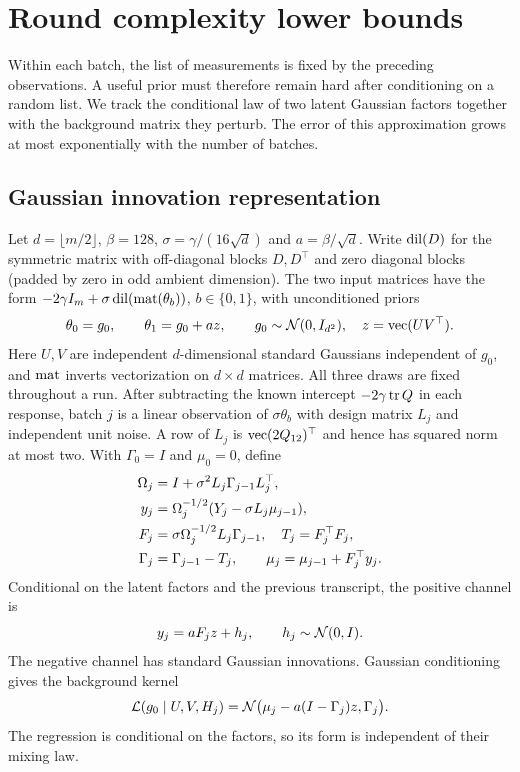 \section{Round complexity lower bounds}
\label{sec:rounds}

Within each batch, the list of measurements is fixed by the preceding observations. A useful prior must therefore remain hard after conditioning on a random list. We track the conditional law of two latent Gaussian factors together with the background matrix they perturb. The error of this approximation grows at most exponentially with the number of batches.

\subsection{Gaussian innovation representation}

Let $d=\lfloor m/2\rfloor$, $\beta=128$, $\sigma=\gamma/(16\sqrt d)$ and $a=\beta/\sqrt d$. Write $\operatorname{dil}(D)$ for the symmetric matrix with off-diagonal blocks $D,D^\top$ and zero diagonal blocks (padded by zero in odd ambient dimension). The two input matrices have the form $-2\gamma I_m+\sigma\operatorname{dil}(\operatorname{mat}(\theta_b))$, $b\in\{0,1\}$, with unconditioned priors
\[
 \theta_0=g_0,\qquad
 \theta_1=g_0+a z,\qquad
 g_0\sim\mathcal N(0,I_{d^2}),\quad z=\operatorname{vec}(UV^\top).
\]
Here $U,V$ are independent $d$-dimensional standard Gaussians independent of $g_0$, and $\operatorname{mat}$ inverts vectorization on $d\times d$ matrices. All three draws are fixed throughout a run. After subtracting the known intercept $-2\gamma\operatorname{tr} Q$ in each response, batch $j$ is a linear observation of $\sigma\theta_b$ with design matrix $L_j$ and independent unit noise. A row of $L_j$ is $\operatorname{vec}(2Q_{12})^\top$ and hence has squared norm at most two. With $\Gamma_0=I$ and $\mu_0=0$, define
\begin{align}
 \Omega_j&=I+\sigma^2L_j\Gamma_{j-1}L_j^\top,\notag\\
 y_j&=\Omega_j^{-1/2}(Y_j-\sigma L_j\mu_{j-1}),\notag\\
 F_j&=\sigma\Omega_j^{-1/2}L_j\Gamma_{j-1},
 \quad T_j=F_j^\top F_j,\label{eq:innovations}\\
 \Gamma_j&=\Gamma_{j-1}-T_j,\qquad
 \mu_j=\mu_{j-1}+F_j^\top y_j.\notag
\end{align}
Conditional on the latent factors and the previous transcript, the positive channel is
\[
 y_j=aF_jz+h_j,\qquad h_j\sim\mathcal N(0,I).
\]
The negative channel has standard Gaussian innovations. Gaussian conditioning gives the background kernel
\begin{equation}
 \mathcal L(g_0\mid U,V,H_j)
 =\mathcal N\bigl(\mu_j-a(I-\Gamma_j)z,\Gamma_j\bigr).
 \label{eq:background-kernel}
\end{equation}
The regression is conditional on the factors, so its form is independent of their mixing law.

